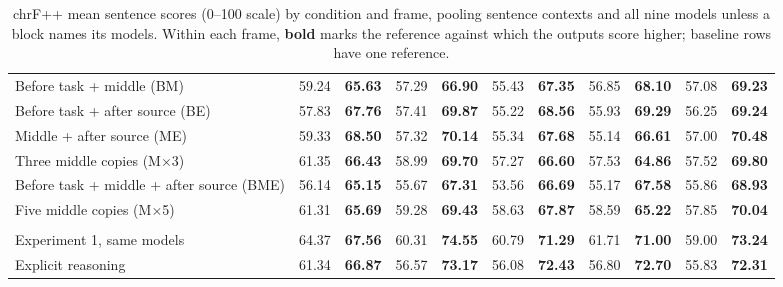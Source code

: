 \documentclass[11pt]{article}
\begin{document}
\begin{CJK*}{UTF8}{gbsn}
\begin{table}[p]
{\begin{tabular}{@{}>{\raggedright\arraybackslash}p{5.0cm}*{10}{r}@{}}
Before task + middle (BM) & 59.24 & \textbf{65.63} & 57.29 & \textbf{66.90} & 55.43 & \textbf{67.35} & 56.85 & \textbf{68.10} & 57.08 & \textbf{69.23} \\
Before task + after source (BE) & 57.83 & \textbf{67.76} & 57.41 & \textbf{69.87} & 55.22 & \textbf{68.56} & 55.93 & \textbf{69.29} & 56.25 & \textbf{69.24} \\
Middle + after source (ME) & 59.33 & \textbf{68.50} & 57.32 & \textbf{70.14} & 55.34 & \textbf{67.68} & 55.14 & \textbf{66.61} & 57.00 & \textbf{70.48} \\
Three middle copies (M$\times$3) & 61.35 & \textbf{66.43} & 58.99 & \textbf{69.70} & 57.27 & \textbf{66.60} & 57.53 & \textbf{64.86} & 57.52 & \textbf{69.80} \\
Before task + middle + after source (BME) & 56.14 & \textbf{65.15} & 55.67 & \textbf{67.31} & 53.56 & \textbf{66.69} & 55.17 & \textbf{67.58} & 55.86 & \textbf{68.93} \\
Five middle copies (M$\times$5) & 61.31 & \textbf{65.69} & 59.28 & \textbf{69.43} & 58.63 & \textbf{67.87} & 58.59 & \textbf{65.22} & 57.85 & \textbf{70.04} \\
\hline
\multicolumn{11}{@{}l}{\textbf{Explicit reasoning: GPT-5.5, Qwen3-8B and Qwen3-32B}}\\*
Experiment 1, same models & 64.37 & \textbf{67.56} & 60.31 & \textbf{74.55} & 60.79 & \textbf{71.29} & 61.71 & \textbf{71.00} & 59.00 & \textbf{73.24} \\
Explicit reasoning & 61.34 & \textbf{66.87} & 56.57 & \textbf{73.17} & 56.08 & \textbf{72.43} & 56.80 & \textbf{72.70} & 55.83 & \textbf{72.31} \\
\hline
\end{tabular}
\caption{chrF++ mean sentence scores (0--100 scale) by condition and frame, pooling sentence contexts and all nine models unless a block names its models. Within each frame, \textbf{bold} marks the reference against which the outputs score higher; baseline rows have one reference.}\label{tab:paper-metric-chrf}
}
\end{table}
\twocolumn


\end{CJK*}
\end{document}
